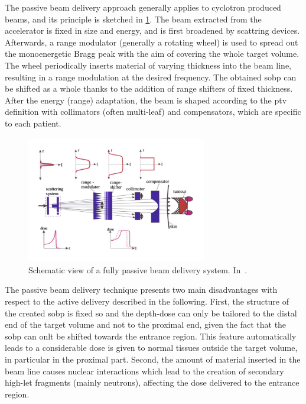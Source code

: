The passive beam delivery approach  generally applies to cyclotron produced beams, and its principle is sketched in \figurename\ref{chap1::fig::passiveDelivery}. The beam extracted from the accelerator is fixed in size and energy, and is first broadened by scattring devices. Afterwards, a range modulator (generally a rotating wheel) is used to spread out the monoenergetic Bragg peak with the aim of covering the whole target volume. The wheel periodically inserts material of varying thickness into the beam line, resulting in a range modulation at the desired frequency. The obtained \gls{sobp} can be shifted as a whole thanks to the addition of range shifters of fixed thickness. After the energy (range) adaptation, the beam is shaped according to the \gls{ptv} definition with collimators (often multi-leaf) and compensators, which are specific to each patient.  

\begin{figure}[!htbp]
\centering
\includegraphics[width=0.7\textwidth]{03_GraphicFiles/chapter1_Introduction/passiveDelivery.pdf}
\caption{Schematic view of a fully passive beam delivery system. In~\cite{Schardt2010}.}
\label{chap1::fig::passiveDelivery}
\end{figure} 

The passive beam delivery technique presents two main disadvantages with respect to the active delivery described in the following. First, the structure of the created \gls{sobp} is fixed so and the depth-dose can only be tailored to the distal end of the target volume and not to the proximal end, given the fact that the \gls{sobp} can onlt be shifted towards the entrance region. This feature automatically leads to a considerable dose is given to normal tissues outside the target volume, in particular in the proximal part. Second, the amount of material inserted in the beam line causes nuclear interactions which lead to the creation of secondary high-\gls{let} fragments (mainly neutrons), affecting the dose delivered to the entrance region.

